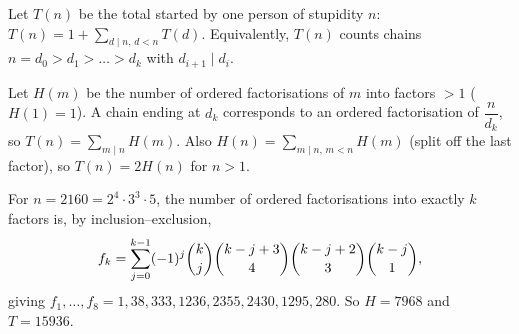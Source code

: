 Let $T(n)$ be the total started by one person of stupidity $n$: $T(n)=1+\sum_{d\mid n,\,d<n}T(d)$. Equivalently, $T(n)$ counts chains $n=d_0>d_1>\dots>d_k$ with $d_{i+1}\mid d_i$.

Let $H(m)$ be the number of ordered factorisations of $m$ into factors $>1$ ($H(1)=1$). A chain ending at $d_k$ corresponds to an ordered factorisation of $\dfrac n{d_k}$, so $T(n)=\sum_{m\mid n}H(m)$. Also $H(n)=\sum_{m\mid n,\,m<n}H(m)$ (split off the last factor), so $T(n)=2H(n)$ for $n>1$.

For $n=2160=2^4\cdot3^3\cdot5$, the number of ordered factorisations into exactly $k$ factors is, by inclusion--exclusion,
\[f_k=\sum_{j=0}^{k-1}(-1)^j\dbinom kj\dbinom{k-j+3}{4}\dbinom{k-j+2}{3}\dbinom{k-j}{1},\]
giving $f_1,\dots,f_8=1,38,333,1236,2355,2430,1295,280$. So $H=7968$ and $T=\boxed{15936}$.

